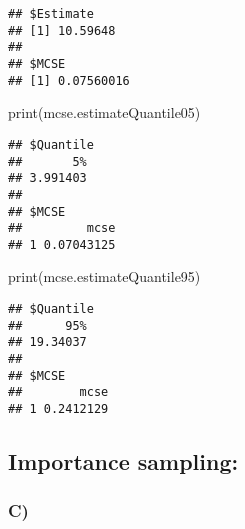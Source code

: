 \documentclass[
]{article}
\newenvironment{Shaded}{\begin{snugshade}}{\end{snugshade}}
\newcommand{\FunctionTok}[1]{\textcolor[rgb]{0.00,0.00,0.00}{#1}}
\newcommand{\NormalTok}[1]{#1}
\begin{document}
\begin{verbatim}
## $Estimate
## [1] 10.59648
## 
## $MCSE
## [1] 0.07560016
\end{verbatim}

\begin{Shaded}
\begin{Highlighting}[]
\FunctionTok{print}\NormalTok{(mcse.estimateQuantile05)}
\end{Highlighting}
\end{Shaded}

\begin{verbatim}
## $Quantile
##       5% 
## 3.991403 
## 
## $MCSE
##         mcse
## 1 0.07043125
\end{verbatim}

\begin{Shaded}
\begin{Highlighting}[]
\FunctionTok{print}\NormalTok{(mcse.estimateQuantile95)}
\end{Highlighting}
\end{Shaded}

\begin{verbatim}
## $Quantile
##      95% 
## 19.34037 
## 
## $MCSE
##        mcse
## 1 0.2412129
\end{verbatim}

\hypertarget{importance-sampling}{%
\subsection{Importance sampling:}\label{importance-sampling}}

\hypertarget{c}{%
\subsubsection{C)}\label{c}}
\end{document}
